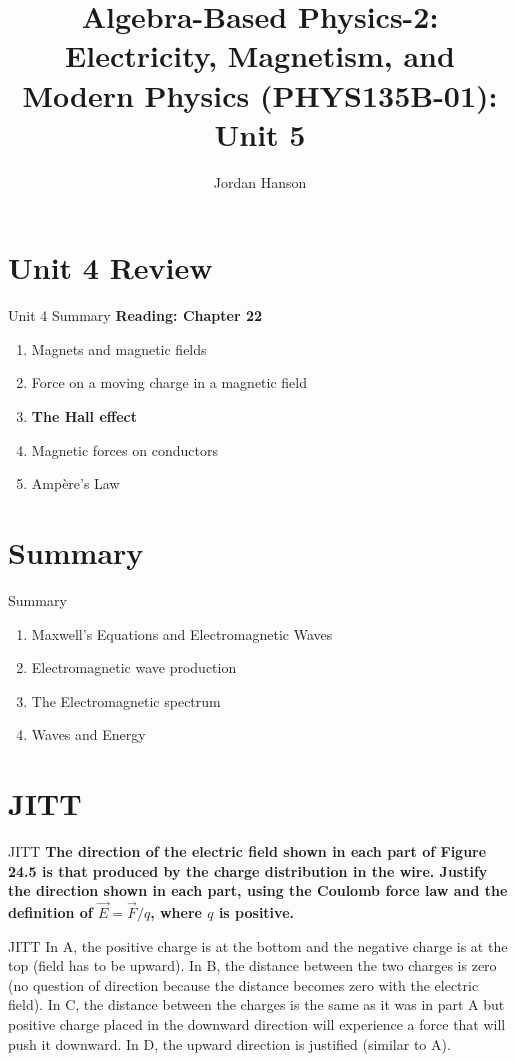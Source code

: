 \documentclass{beamer}
\title{Algebra-Based Physics-2: Electricity, Magnetism, and Modern Physics (PHYS135B-01): Unit 5}
\author{Jordan Hanson}
\institute{Whittier College Department of Physics and Astronomy}
\begin{document}
\maketitle

\section{Unit 4 Review}

\begin{frame}{Unit 4 Summary}
\textbf{Reading: Chapter 22}
\begin{enumerate}
\item Magnets and magnetic fields
\item Force on a moving charge in a magnetic field
\item \textbf{The Hall effect}
\item Magnetic forces on conductors
\item \alert{Amp\`{e}re's Law}
\end{enumerate}
\end{frame}

\section{Summary}

\begin{frame}{Summary}
\begin{enumerate}
\item Maxwell's Equations and Electromagnetic Waves
\item Electromagnetic wave production
\item The Electromagnetic spectrum
\item Waves and Energy
\end{enumerate}
\end{frame}

\section{JITT}

\begin{frame}{JITT}
\textbf{The direction of the electric field shown in each part of Figure 24.5 is that produced by the charge distribution in the wire.  Justify the direction shown in each part, using the Coulomb force law and the definition of $\vec{E} = \vec{F}/q$, where $q$ is positive.}
\end{frame}

\begin{frame}{JITT}
In A, the positive charge is at the bottom and the negative charge is at the top (field has to be upward). In B, the distance between the two charges is zero (no question of direction because the distance becomes zero with the electric field). In C, the distance between the charges is the same as it was in part A but positive charge placed in the downward direction will experience a force that will push it downward. In D, the upward direction is justified (similar to A). 
\end{frame}
\end{document}
